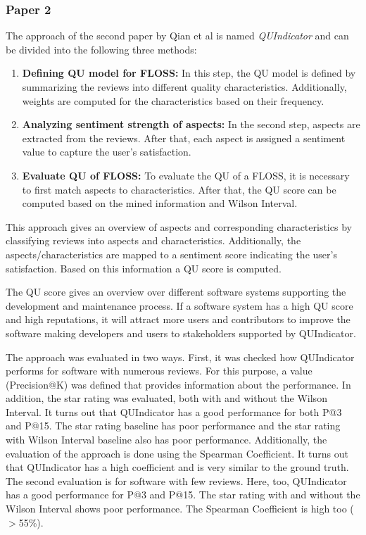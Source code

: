 \subsubsection*{Paper 2}
The approach of the second paper by Qian et al is named \textit{QUIndicator} and can be divided into the following three methods:

\begin{enumerate}
    \item \textbf{Defining QU model for FLOSS:} In this step, the QU model is defined by summarizing the reviews into different quality characteristics. Additionally, weights are computed for the characteristics based on their frequency.
    \item \textbf{Analyzing sentiment strength of aspects:} In the second step, aspects are extracted from the reviews. After that, each aspect is assigned a sentiment value to capture the user's satisfaction.
    \item \textbf{Evaluate QU of FLOSS:} To evaluate the QU of a FLOSS, it is necessary to first match aspects to characteristics. After that, the QU score can be computed based on the mined information and Wilson Interval.
\end{enumerate}

This approach gives an overview of aspects and corresponding characteristics by classifying reviews into aspects and characteristics. Additionally, the aspects/characteristics are mapped to a sentiment score indicating the user's satisfaction. Based on this information a QU score is computed.

The QU score gives an overview over different software systems supporting the development and maintenance process. If a software system has a high QU score and high reputations, it will attract more users and contributors to improve the software making developers and users to stakeholders supported by QUIndicator.

The approach was evaluated in two ways. First, it was checked how QUIndicator performs for software with numerous reviews. For this purpose, a value (Precision@K) was defined that provides information about the performance. In addition, the star rating was evaluated, both with and without the Wilson Interval. It turns out that QUIndicator has a good performance for both P@3 and P@15. The star rating baseline has poor performance and the star rating with Wilson Interval baseline also has poor performance. Additionally, the evaluation of the approach is done using the Spearman Coefficient. It turns out that QUIndicator has a high coefficient and is very similar to the ground truth. The second evaluation is for software with few reviews. Here, too, QUIndicator has a good performance for P@3 and P@15. The star rating with and without the Wilson Interval shows poor performance. The Spearman Coefficient is high too ($>$55\%).

